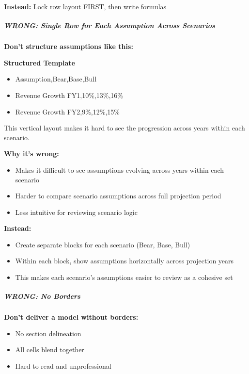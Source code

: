 \documentclass[11pt]{article}
\begin{document}
\textbf{Instead:} Lock row layout FIRST, then write formulas


\subparagraph{WRONG: Single Row for Each Assumption Across Scenarios}\mbox{}\par

\textbf{Don't structure assumptions like this:}

\textbf{Structured Template}
\begin{itemize}[leftmargin=*,itemsep=2pt,topsep=2pt]
\item {} Assumption,Bear,Base,Bull
\item {} Revenue Growth FY1,10\%,13\%,16\%
\item {} Revenue Growth FY2,9\%,12\%,15\%
\end{itemize}
This vertical layout makes it hard to see the progression across years within each scenario.


\textbf{Why it's wrong:}

\begin{itemize}[leftmargin=*,itemsep=2pt,topsep=2pt]
\item {} Makes it difficult to see assumptions evolving across years within each scenario
\item {} Harder to compare scenario assumptions across full projection period
\item {} Less intuitive for reviewing scenario logic
\end{itemize}

\textbf{Instead:}

\begin{itemize}[leftmargin=*,itemsep=2pt,topsep=2pt]
\item {} Create separate blocks for each scenario (Bear, Base, Bull)
\item {} Within each block, show assumptions horizontally across projection years
\item {} This makes each scenario's assumptions easier to review as a cohesive set
\end{itemize}

\subparagraph{WRONG: No Borders}\mbox{}\par

\textbf{Don't deliver a model without borders:}

\begin{itemize}[leftmargin=*,itemsep=2pt,topsep=2pt]
\item {} No section delineation
\item {} All cells blend together
\item {} Hard to read and unprofessional
\end{itemize}
\end{document}
